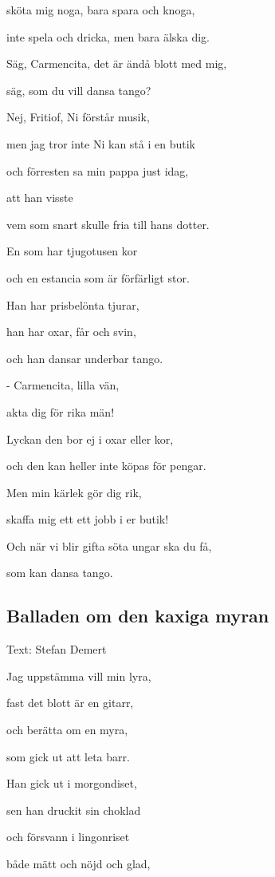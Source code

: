 sköta mig noga, bara spara och knoga,

inte spela och dricka, men bara älska dig.

Säg, Carmencita, det är ändå blott med mig,

säg, som du vill dansa tango? \bigskip



Nej, Fritiof, Ni förstår musik,

men jag tror inte Ni kan stå i en butik

och förresten sa min pappa just idag,

att han visste

vem som snart skulle fria till hans dotter.

En som har tjugotusen kor

och en estancia som är förfärligt stor.

Han har prisbelönta tjurar,

han har oxar, får och svin,

och han dansar underbar tango.\bigskip



- Carmencita, lilla vän,

akta dig för rika män!

Lyckan den bor ej i oxar eller kor,

och den kan heller inte köpas för pengar.

Men min kärlek gör dig rik,

skaffa mig ett ett jobb i er butik!

Och när vi blir gifta söta ungar ska du få,

som kan dansa tango. \bigskip


\subsection{\textbf{Balladen om den kaxiga myran}}

Text: Stefan Demert\bigskip

Jag uppstämma vill min lyra,

fast det blott är en gitarr,

och berätta om en myra,

som gick ut att leta barr.

Han gick ut i morgondiset,

sen han druckit sin choklad

och försvann i lingonriset

både mätt och nöjd och glad,

